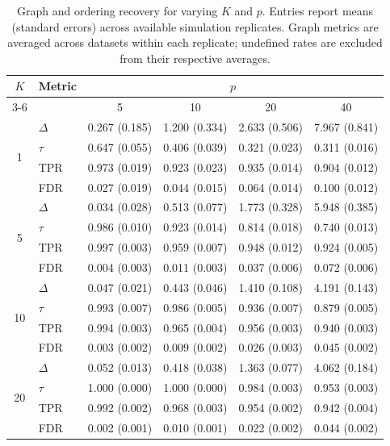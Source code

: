\begin{table}[!h]
\centering
{}
\caption{Graph and ordering recovery for varying $K$ and $p$. Entries report means (standard errors) across available simulation replicates. Graph metrics are averaged across datasets within each replicate; undefined rates are excluded from their respective averages.}
\label{tab:performance_multiple}
\begingroup
\small
\renewcommand{\arraystretch}{1.3}
\begin{tabular}{clcccc}
\toprule
$K$ & Metric & \multicolumn{4}{c}{$p$} \\
\cmidrule(lr){3-6}
& & 5 & 10 & 20 & 40 \\
\midrule
\multirow{4}{*}{1} & $\Delta$ & 0.267 (0.185) & 1.200 (0.334) & 2.633 (0.506) & 7.967 (0.841) \\
 & $\tau$ & 0.647 (0.055) & 0.406 (0.039) & 0.321 (0.023) & 0.311 (0.016) \\
 & TPR & 0.973 (0.019) & 0.923 (0.023) & 0.935 (0.014) & 0.904 (0.012) \\
 & FDR & 0.027 (0.019) & 0.044 (0.015) & 0.064 (0.014) & 0.100 (0.012) \\
\midrule
\multirow{4}{*}{5} & $\Delta$ & 0.034 (0.028) & 0.513 (0.077) & 1.773 (0.328) & 5.948 (0.385) \\
 & $\tau$ & 0.986 (0.010) & 0.923 (0.014) & 0.814 (0.018) & 0.740 (0.013) \\
 & TPR & 0.997 (0.003) & 0.959 (0.007) & 0.948 (0.012) & 0.924 (0.005) \\
 & FDR & 0.004 (0.003) & 0.011 (0.003) & 0.037 (0.006) & 0.072 (0.006) \\
\midrule
\multirow{4}{*}{10} & $\Delta$ & 0.047 (0.021) & 0.443 (0.046) & 1.410 (0.108) & 4.191 (0.143) \\
 & $\tau$ & 0.993 (0.007) & 0.986 (0.005) & 0.936 (0.007) & 0.879 (0.005) \\
 & TPR & 0.994 (0.003) & 0.965 (0.004) & 0.956 (0.003) & 0.940 (0.003) \\
 & FDR & 0.003 (0.002) & 0.009 (0.002) & 0.026 (0.003) & 0.045 (0.002) \\
\midrule
\multirow{4}{*}{20} & $\Delta$ & 0.052 (0.013) & 0.418 (0.038) & 1.363 (0.077) & 4.062 (0.184) \\
 & $\tau$ & 1.000 (0.000) & 1.000 (0.000) & 0.984 (0.003) & 0.953 (0.003) \\
 & TPR & 0.992 (0.002) & 0.968 (0.003) & 0.954 (0.002) & 0.942 (0.004) \\
 & FDR & 0.002 (0.001) & 0.010 (0.001) & 0.022 (0.002) & 0.044 (0.002) \\
\bottomrule
\end{tabular}
\endgroup
\end{table}
